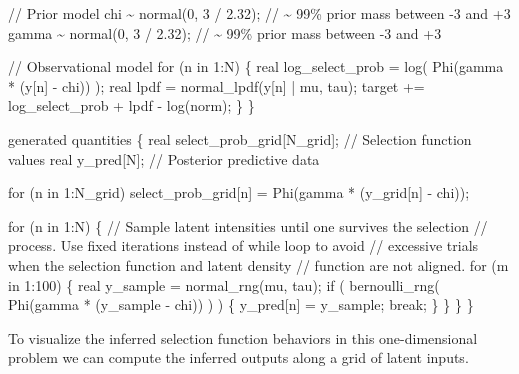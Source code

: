 \documentclass[
  letterpaper,
  DIV=11,
  numbers=noendperiod]{scrartcl}
\newenvironment{Shaded}{\begin{snugshade}}{\end{snugshade}}
\newcommand{\CommentTok}[1]{\textcolor[rgb]{0.37,0.37,0.37}{#1}}
\newcommand{\ControlFlowTok}[1]{\textcolor[rgb]{0.00,0.23,0.31}{#1}}
\newcommand{\DataTypeTok}[1]{\textcolor[rgb]{0.68,0.00,0.00}{#1}}
\newcommand{\DecValTok}[1]{\textcolor[rgb]{0.68,0.00,0.00}{#1}}
\newcommand{\FloatTok}[1]{\textcolor[rgb]{0.68,0.00,0.00}{#1}}
\newcommand{\KeywordTok}[1]{\textcolor[rgb]{0.00,0.23,0.31}{#1}}
\newcommand{\NormalTok}[1]{\textcolor[rgb]{0.00,0.23,0.31}{#1}}
\begin{document}
\begin{codelisting}
\begin{Shaded}
\begin{Highlighting}[]
  \CommentTok{// Prior model}
\NormalTok{  chi \textasciitilde{} normal(}\DecValTok{0}\NormalTok{, }\DecValTok{3}\NormalTok{ / }\FloatTok{2.32}\NormalTok{);   }\CommentTok{// \textasciitilde{} 99\% prior mass between {-}3 and +3}
\NormalTok{  gamma \textasciitilde{} normal(}\DecValTok{0}\NormalTok{, }\DecValTok{3}\NormalTok{ / }\FloatTok{2.32}\NormalTok{); }\CommentTok{// \textasciitilde{} 99\% prior mass between {-}3 and +3}
  
  \CommentTok{// Observational model}
  \ControlFlowTok{for}\NormalTok{ (n }\ControlFlowTok{in} \DecValTok{1}\NormalTok{:N) \{}
    \DataTypeTok{real}\NormalTok{ log\_select\_prob = log( Phi(gamma * (y[n] {-} chi)) );}
    \DataTypeTok{real}\NormalTok{ lpdf = normal\_lpdf(y[n] | mu, tau);}
    \KeywordTok{target +=}\NormalTok{ log\_select\_prob + lpdf {-} log(norm);}
\NormalTok{  \}}
\NormalTok{\}}

\KeywordTok{generated quantities}\NormalTok{ \{}
  \DataTypeTok{real}\NormalTok{ select\_prob\_grid[N\_grid]; }\CommentTok{// Selection function values}
  \DataTypeTok{real}\NormalTok{ y\_pred[N];                }\CommentTok{// Posterior predictive data}
  
  \ControlFlowTok{for}\NormalTok{ (n }\ControlFlowTok{in} \DecValTok{1}\NormalTok{:N\_grid)}
\NormalTok{    select\_prob\_grid[n] = Phi(gamma * (y\_grid[n] {-} chi));}
  
  \ControlFlowTok{for}\NormalTok{ (n }\ControlFlowTok{in} \DecValTok{1}\NormalTok{:N) \{}
    \CommentTok{// Sample latent intensities until one survives the selection}
    \CommentTok{// process.  Use fixed iterations instead of while loop to avoid }
    \CommentTok{// excessive trials when the selection function and latent density }
    \CommentTok{// function are not aligned.}
    \ControlFlowTok{for}\NormalTok{ (m }\ControlFlowTok{in} \DecValTok{1}\NormalTok{:}\DecValTok{100}\NormalTok{) \{}
      \DataTypeTok{real}\NormalTok{ y\_sample = normal\_rng(mu, tau);}
      \ControlFlowTok{if}\NormalTok{ ( bernoulli\_rng( Phi(gamma * (y\_sample {-} chi)) ) ) \{}
\NormalTok{        y\_pred[n] = y\_sample;}
        \ControlFlowTok{break}\NormalTok{;}
\NormalTok{      \}}
\NormalTok{    \}}
\NormalTok{  \}}
\NormalTok{\}}
\end{Highlighting}
\end{Shaded}

\end{codelisting}

To visualize the inferred selection function behaviors in this
one-dimensional problem we can compute the inferred outputs along a grid
of latent inputs.
\end{document}
